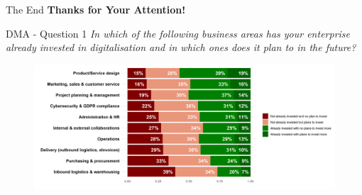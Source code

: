 \documentclass{beamer}
\begin{document}

\begin{frame}{The End}
    \centering
    \large\textbf{Thanks for Your Attention!}
    
\end{frame}


    \begin{frame}{DMA - Question 1}
        \centering\textit{In which of the following business areas has your enterprise already invested in digitalisation and in
        which ones does it plan to in the future?}
        \begin{figure}
            \centering
            \includegraphics[width=\textwidth]{../Output/q1collapsed.png}

        \end{figure}
    \end{frame}
\end{document}

